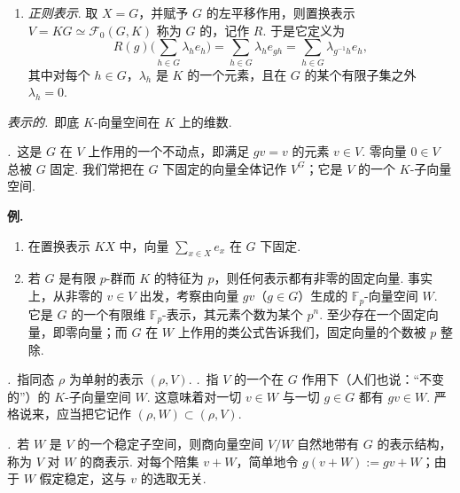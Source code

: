 \begin{numpara}[例]
\begin{enumerate}[label=\roman*)]
\[\begin{array}{rcl}
\end{array}
\]
给出，其中 $\delta_x$ 是以 $x$ 为中心的 Dirac 函数，定义为：当 $x\neq y$ 时 $\delta_x(y)=0$，而 $\delta_x(x)=1$. 由上面的公式可知 $g.\delta_x=\delta_{g.x}$. 于是上述同构与 $G$ 在 $KX$ 及 $\mathcal{F}_0(X,K)$ 上的表示相容.
\item \emph{正则表示}. 取 $X=G$，并赋予 $G$ 的左平移作用，则置换表示 $V=KG\simeq\mathcal{F}_0(G,K)$ 称为 $G$ 的，记作 $R$. 于是它定义为
\[
R(g)\Biggl(\sum_{h\in G}\lambda_h e_h\Biggr)=\sum_{h\in G}\lambda_h e_{gh}=\sum_{h\in G}\lambda_{g^{-1}h}e_h,
\]
其中对每个 $h\in G$，$\lambda_h$ 是 $K$ 的一个元素，且在 $G$ 的某个有限子集之外 $\lambda_h=0$.
\end{enumerate}
\end{numpara}

\begin{numpara}[小词典]\label{np:fg-4-1-3}
\emph{表示的.}~即底 $K$-向量空间在 $K$ 上的维数.

\emph{.}~这是 $G$ 在 $V$ 上作用的一个不动点，即满足 $gv=v$ 的元素 $v\in V$. 零向量 $0\in V$ 总被 $G$ 固定. 我们常把在 $G$ 下固定的向量全体记作 $V^G$；它是 $V$ 的一个 $K$-子向量空间.

\noindent\textbf{例.}
\begin{enumerate}[label=\roman*)]
\item 在置换表示 $KX$ 中，向量 $\sum_{x\in X}e_x$ 在 $G$ 下固定.
\item 若 $G$ 是有限 $p$-群而 $K$ 的特征为 $p$，则任何表示都有非零的固定向量. 事实上，从非零的 $v\in V$ 出发，考察由向量 $gv$（$g\in G$）生成的 $\mathbb{F}_p$-向量空间 $W$. 它是 $G$ 的一个有限维 $\mathbb{F}_p$-表示，其元素个数为某个 $p^n$. 至少存在一个固定向量，即零向量；而 $G$ 在 $W$ 上作用的类公式告诉我们，固定向量的个数被 $p$ 整除.
\end{enumerate}
\emph{.}~指同态 $\rho$ 为单射的表示 $(\rho,V)$.
\emph{.}~指 $V$ 的一个在 $G$ 作用下（人们也说：``不变的''）的 $K$-子向量空间 $W$. 这意味着对一切 $v\in W$ 与一切 $g\in G$ 都有 $gv\in W$. 严格说来，应当把它记作 $(\rho,W)\subset(\rho,V)$.

\emph{.}~若 $W$ 是 $V$ 的一个稳定子空间，则商向量空间 $V/W$ 自然地带有 $G$ 的表示结构，称为 $V$ 对 $W$ 的商表示. 对每个陪集 $v+W$，简单地令 $g(v+W):=gv+W$；由于 $W$ 假定稳定，这与 $v$ 的选取无关.
\end{numpara}


